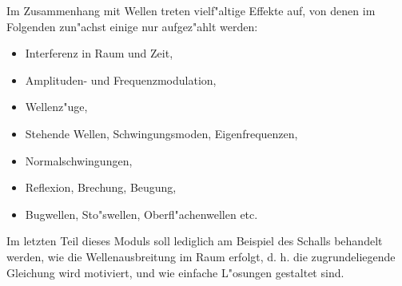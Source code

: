 \begin{MIntro}
Im Zusammenhang mit Wellen treten vielf"altige Effekte auf, von denen im Folgenden zun"achst einige nur aufgez"ahlt werden:
\begin{itemize}
  \item Interferenz in Raum und Zeit,
  \item Amplituden- und Frequenzmodulation,
  \item Wellenz"uge,
  \item Stehende Wellen, Schwingungsmoden, Eigenfrequenzen,
  \item Normalschwingungen,
  \item Reflexion, Brechung, Beugung,
  \item Bugwellen, Sto"swellen, Oberfl"achenwellen etc.
\end{itemize}
Im letzten Teil dieses Moduls soll lediglich am Beispiel des Schalls behandelt werden, wie die Wellenausbreitung im Raum erfolgt, d. h. die zugrundeliegende Gleichung wird motiviert, und wie einfache L"osungen gestaltet sind.
\end{MIntro}


